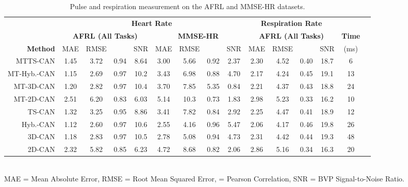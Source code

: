 \documentclass{article}
\begin{document}
\begin{table*}[t]
	\footnotesize
	\caption{Pulse and respiration measurement on the AFRL and MMSE-HR datasets.}
	\label{tab:SM_AFRL_MMSE}
	\centering
	\setlength\tabcolsep{3pt} \begin{tabular}{r|cccc|cccc|cccc|cc}
	\toprule
		& \multicolumn{8}{c}{\textbf{Heart Rate}} & \multicolumn{4}{c}{\textbf{Respiration Rate}} \\
		& \multicolumn{4}{c}{\textbf{AFRL (All Tasks) }} &  \multicolumn{4}{c}{\textbf{MMSE-HR}}  & \multicolumn{4}{c}{\textbf{AFRL (All Tasks) }} & \textbf{Time}\\
        \textbf{Method} & MAE & RMSE &  & SNR & MAE & RMSE &  & SNR & MAE & RMSE &  & SNR & (ms)\\ \hline \hline
        MTTS-CAN & 1.45 &  3.72 & 0.94 & 8.64 & 3.00 & 5.66 & 0.92 & 2.37 & 2.30 & 4.52 & 0.40 & 18.7 & 6 \\
        MT-Hyb.-CAN & 1.15 & 2.69 & 0.97 & 10.2 & 3.43 & 6.98 & 0.88 & 4.70 & 2.17 & 4.24 & 0.45 & 19.1 & 13 \\ 
        MT-3D-CAN & 1.20 & 2.82 & 0.97 & 10.4 & 3.70 & 7.85 & 5.35 & 0.84 & 2.21 & 4.37 & 0.43 & 18.8 & 24\\
        MT-2D-CAN & 2.51 & 6.20 & 0.83 & 6.03 & 5.14 & 10.3 & 0.73 & 1.83 & 2.98 & 5.23 & 0.33 & 16.2 & 10\\
        TS-CAN & 1.32 &  3.25 & 0.95 & 8.86 & 3.41 & 7.82 & 0.84  & 2.92  & 2.25 & 4.47 & 0.41 & 18.9 & 12 \\
        Hyb.-CAN & 1.12 & 2.60 & 0.97 & 10.6 & 2.55 & 4.16 & 0.96 & 5.47  & 2.06 & 4.17 & 0.46 & 19.8 & 26 \\
        3D-CAN & 1.18 & 2.83 & 0.97 & 10.5 & 2.78 & 5.08 & 0.94 & 4.73 & 2.31 & 4.42 & 0.44 & 19.3 & 48  \\ \hdashline
        2D-CAN & 2.32 & 5.82 & 0.85 & 6.23 & 4.72 & 8.68 &  0.82 & 2.06  & 2.86 & 5.16 & 0.34 & 16.3 & 20  \\
        \bottomrule 
   \end{tabular}
   \\
   \tiny
   MAE = Mean Absolute Error, RMSE = Root Mean Squared Error,  = Pearson Correlation, SNR = BVP Signal-to-Noise Ratio.
   \vspace{-0.4cm}
\end{table*}
\end{document}
